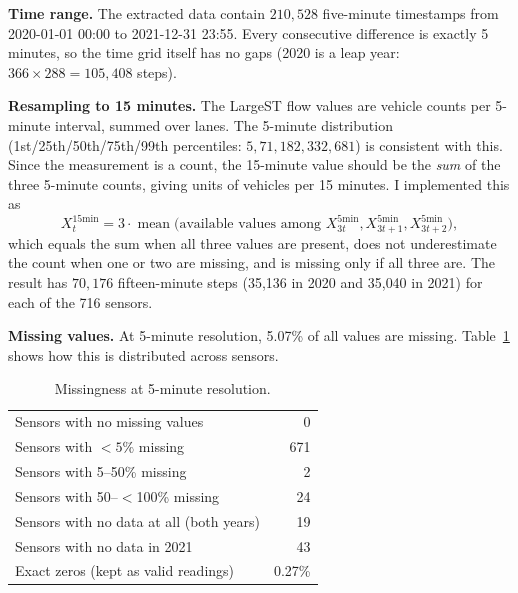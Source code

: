 \documentclass[11pt, a4paper]{article}
\begin{document}
\textbf{Time range.} The extracted data contain $210{,}528$ five-minute timestamps from 2020-01-01 00:00 to 2021-12-31 23:55. Every consecutive difference is exactly 5 minutes, so the time grid itself has no gaps (2020 is a leap year: $366 \times 288 = 105{,}408$ steps).

\textbf{Resampling to 15 minutes.} The LargeST flow values are vehicle counts per 5-minute interval, summed over lanes. The 5-minute distribution (1st/25th/50th/75th/99th percentiles: $5, 71, 182, 332, 681$) is consistent with this. Since the measurement is a count, the 15-minute value should be the \emph{sum} of the three 5-minute counts, giving units of vehicles per 15 minutes. I implemented this as
\[
X^{15\text{min}}_t = 3 \cdot \operatorname{mean}\big(\text{available values among } X^{5\text{min}}_{3t}, X^{5\text{min}}_{3t+1}, X^{5\text{min}}_{3t+2}\big),
\]
which equals the sum when all three values are present, does not underestimate the count when one or two are missing, and is missing only if all three are. The result has $70{,}176$ fifteen-minute steps (35{,}136 in 2020 and 35{,}040 in 2021) for each of the 716 sensors.

\textbf{Missing values.} At 5-minute resolution, 5.07\% of all values are missing. Table~\ref{tab:missing} shows how this is distributed across sensors.

\begin{table}[H]
\centering
\small
\begin{tabular}{@{}lr@{}}
\toprule
Sensors with no missing values & 0 \\
Sensors with $<5\%$ missing & 671 \\
Sensors with 5--50\% missing & 2 \\
Sensors with 50--$<$100\% missing & 24 \\
Sensors with no data at all (both years) & 19 \\
Sensors with no data in 2021 & 43 \\
\midrule
Exact zeros (kept as valid readings) & 0.27\% \\
\bottomrule
\end{tabular}
\caption{Missingness at 5-minute resolution.}
\label{tab:missing}
\end{table}
\end{document}
